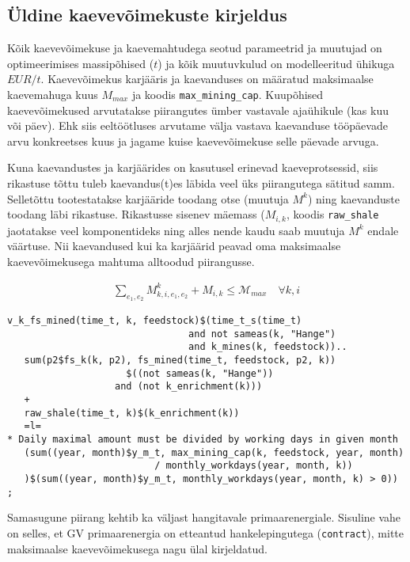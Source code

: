\documentclass[10pt,a4paper]{article}
\begin{document}
\subsection{Üldine kaevevõimekuste kirjeldus}
Kõik kaevevõimekuse ja kaevemahtudega seotud parameetrid ja muutujad on optimeerimises massipõhised ($t$) ja kõik muutuvkulud on modelleeritud ühikuga $EUR/t$. Kaevevõimekus karjääris ja kaevanduses on määratud maksimaalse kaevemahuga kuus $\mathit{M}_{max}$ ja koodis \texttt{max\_mining\_cap}. Kuupõhised kaevevõimekused arvutatakse piirangutes ümber vastavale ajaühikule (kas kuu või päev). Ehk siis eeltöötluses arvutame välja vastava kaevanduse tööpäevade arvu konkreetses kuus ja jagame kuise kaevevõimekuse selle päevade arvuga.

Kuna kaevandustes ja karjäärides on kasutusel erinevad kaeveprotsessid, siis rikastuse tõttu tuleb kaevandus(t)es läbida veel üks piirangutega sätitud samm. Selletõttu tootestatakse karjääride toodang otse (muutuja $M^k$) ning kaevanduste toodang läbi rikastuse. Rikastusse sisenev mäemass ($M_{i,k}$, koodis \texttt{raw\_shale} jaotatakse veel komponentideks ning alles nende kaudu saab muutuja $M^k$ endale väärtuse. Nii kaevandused kui ka karjäärid peavad oma maksimaalse kaevevõimekusega mahtuma alltoodud piirangusse.

\begin{align}
\sum_{e_1,e_2} M^k_{k,i,e_1, e_2} 
+
M_{i,k}
\le \mathcal{M}_{max} \quad \forall k,i
\end{align}

\begin{verbatim}
v_k_fs_mined(time_t, k, feedstock)$(time_t_s(time_t)
                                and not sameas(k, "Hange")
                                and k_mines(k, feedstock))..
   sum(p2$fs_k(k, p2), fs_mined(time_t, feedstock, p2, k))
                     $((not sameas(k, "Hange")) 
                   and (not k_enrichment(k)))
   +
   raw_shale(time_t, k)$(k_enrichment(k))
   =l=
* Daily maximal amount must be divided by working days in given month
   (sum((year, month)$y_m_t, max_mining_cap(k, feedstock, year, month)
                          / monthly_workdays(year, month, k))
   )$(sum((year, month)$y_m_t, monthly_workdays(year, month, k) > 0))
;
\end{verbatim}

Samasugune piirang kehtib ka väljast hangitavale primaarenergiale. Sisuline vahe on selles, et GV primaarenergia on etteantud hankelepingutega (\texttt{contract}), mitte maksimaalse kaevevõimekusega nagu ülal kirjeldatud.
\end{document}
